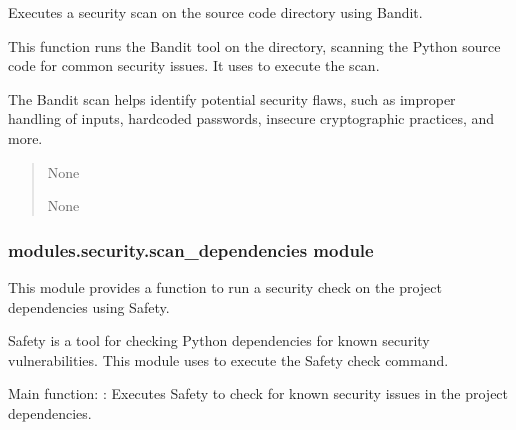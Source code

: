 \documentclass[letterpaper,10pt,english]{sphinxmanual}
\begin{document}
\begin{fulllineitems}
\label{\detokenize{modules.security:modules.security.scan_code.run_bandit_scan}}
\pysigstartsignatures
\pysiglinewithargsret
{}
{}
{}
\pysigstopsignatures
\sphinxAtStartPar
Executes a security scan on the source code directory using Bandit.

\sphinxAtStartPar
This function runs the Bandit tool on the  directory, scanning the Python source code
for common security issues. It uses  to execute the scan.

\sphinxAtStartPar
The Bandit scan helps identify potential security flaws, such as improper handling of inputs, hardcoded
passwords, insecure cryptographic practices, and more.
\begin{quote}\begin{description}
\sphinxAtStartPar
None

\sphinxAtStartPar
None

\end{description}\end{quote}

\end{fulllineitems}



\subsubsection{modules.security.scan\_dependencies module}
\label{\detokenize{modules.security:module-modules.security.scan_dependencies}}\label{\detokenize{modules.security:modules-security-scan-dependencies-module}}
\sphinxAtStartPar
This module provides a function to run a security check on the project dependencies using Safety.

\sphinxAtStartPar
Safety is a tool for checking Python dependencies for known security vulnerabilities. This module uses 
to execute the Safety check command.

\sphinxAtStartPar
Main function:
\sphinxhyphen{} : Executes Safety to check for known security issues in the project dependencies.
\end{document}
